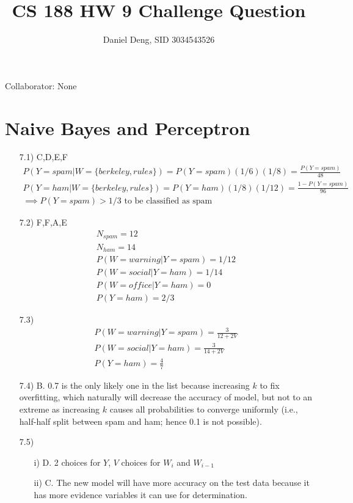 \documentclass[11pt]{article}
\title{CS 188 HW 9 Challenge Question}
\author{Daniel Deng, SID 3034543526}
\date{}
\theoremstyle{definition}
\theoremstyle{remark}
\begin{document}
\maketitle

Collaborator: None

\section{Naive Bayes and Perceptron}
\begin{enumerate}
\item[7.1)] C,D,E,F
\begin{align*}
P(Y=spam | W = \{berkeley, rules\}) = P(Y=spam)(1/6)(1/8) = \tfrac{P(Y=spam)}{48} \\
P(Y=ham | W = \{berkeley, rules\}) = P(Y=ham)(1/8)(1/12) = \tfrac{1-P(Y=spam)}{96} \\
\implies P(Y=spam) > 1/3 \text{ to be classified as spam}
\end{align*}

\item[7.2)] F,F,A,E
\begin{align*}
N_{spam} = 12 \\
N_{ham} = 14 \\
P(W=warning|Y=spam) = 1/12 \\
P(W=social|Y=ham) = 1/14 \\
P(W=office|Y=ham) = 0 \\
P(Y=ham) = 2/3
\end{align*}

\item[7.3)]
\begin{align*}
P(W=warning|Y=spam) = \frac{3}{12+2V} \\
P(W=social|Y=ham) = \frac{3}{14+2V} \\
P(Y=ham) = \frac{4}{7}
\end{align*}

\item[7.4)] B. 0.7 is the only likely one in the list because increasing $k$ to fix overfitting, which naturally will decrease the accuracy of model, but not to an extreme as increasing $k$ causes all probabilities to converge uniformly (i.e., half-half split between spam and ham; hence 0.1 is not possible). 

\item[7.5)] 
\begin{enumerate}
\item[i)] D. 2 choices for $Y$, $V$ choices for $W_i$ and $W_{i-1}$
\item[ii)] C. The new model will have more accuracy on the test data because it has more evidence variables it can use for determination.
\end{enumerate}


\end{enumerate}
\end{document}
